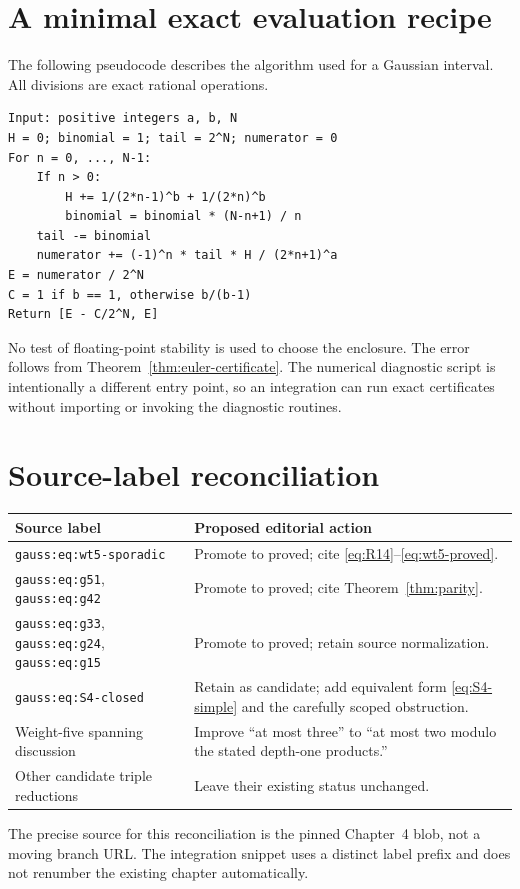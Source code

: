 \documentclass[11pt,a4paper]{article}
\numberwithin{equation}{section}
\theoremstyle{definition}
\theoremstyle{remark}
\begin{document}
\section{A minimal exact evaluation recipe}
\label{app:recipe}
The following pseudocode describes the algorithm used for a Gaussian interval. All divisions are exact rational operations.
\begin{lstlisting}
Input: positive integers a, b, N
H = 0; binomial = 1; tail = 2^N; numerator = 0
For n = 0, ..., N-1:
    If n > 0:
        H += 1/(2*n-1)^b + 1/(2*n)^b
        binomial = binomial * (N-n+1) / n
    tail -= binomial
    numerator += (-1)^n * tail * H / (2*n+1)^a
E = numerator / 2^N
C = 1 if b == 1, otherwise b/(b-1)
Return [E - C/2^N, E]
\end{lstlisting}
No test of floating-point stability is used to choose the enclosure. The error follows from Theorem~\ref{thm:euler-certificate}. The numerical diagnostic script is intentionally a different entry point, so an integration can run exact certificates without importing or invoking the diagnostic routines.

\section{Source-label reconciliation}
\label{app:labels}
\begin{center}
\small
\begin{tabular}{@{}>{\raggedright\arraybackslash}p{.39\linewidth}>{\raggedright\arraybackslash}p{.52\linewidth}@{}}
\toprule
Source label & Proposed editorial action\\
\midrule
\texttt{gauss:eq:wt5-sporadic} & Promote to proved; cite \eqref{eq:R14}--\eqref{eq:wt5-proved}.\\
\texttt{gauss:eq:g51}, \texttt{gauss:eq:g42} & Promote to proved; cite Theorem~\ref{thm:parity}.\\
\texttt{gauss:eq:g33}, \texttt{gauss:eq:g24}, \texttt{gauss:eq:g15} & Promote to proved; retain source normalization.\\
\texttt{gauss:eq:S4-closed} & Retain as candidate; add equivalent form \eqref{eq:S4-simple} and the carefully scoped obstruction.\\
Weight-five spanning discussion & Improve ``at most three'' to ``at most two modulo the stated depth-one products.''\\
Other candidate triple reductions & Leave their existing status unchanged.\\
\bottomrule
\end{tabular}
\end{center}
The precise source for this reconciliation is the pinned Chapter~4 blob, not a moving branch URL. The integration snippet uses a distinct label prefix and does not renumber the existing chapter automatically.
\end{document}
